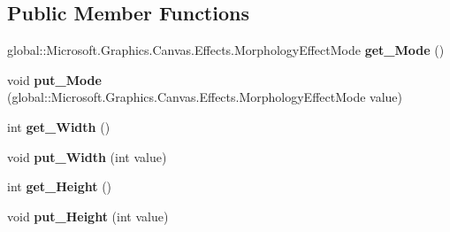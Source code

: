\subsection*{Public Member Functions}
\begin{DoxyCompactItemize}
\item 
\mbox{\label{interface_microsoft_1_1_graphics_1_1_canvas_1_1_effects_1_1_i_morphology_effect_a4625903e2e2033038f140f494007ccef}} 
global\+::\+Microsoft.\+Graphics.\+Canvas.\+Effects.\+Morphology\+Effect\+Mode {\bfseries get\+\_\+\+Mode} ()
\item 
\mbox{\label{interface_microsoft_1_1_graphics_1_1_canvas_1_1_effects_1_1_i_morphology_effect_ae67e959972393bca5d6e02aa06cd227b}} 
void {\bfseries put\+\_\+\+Mode} (global\+::\+Microsoft.\+Graphics.\+Canvas.\+Effects.\+Morphology\+Effect\+Mode value)
\item 
\mbox{\label{interface_microsoft_1_1_graphics_1_1_canvas_1_1_effects_1_1_i_morphology_effect_a30eb746728372b5fdd4c6e783b9a3545}} 
int {\bfseries get\+\_\+\+Width} ()
\item 
\mbox{\label{interface_microsoft_1_1_graphics_1_1_canvas_1_1_effects_1_1_i_morphology_effect_ac8928007cf4daceb6edf45df25104160}} 
void {\bfseries put\+\_\+\+Width} (int value)
\item 
\mbox{\label{interface_microsoft_1_1_graphics_1_1_canvas_1_1_effects_1_1_i_morphology_effect_a894c0a79c2bf5a0314930c5c502a7662}} 
int {\bfseries get\+\_\+\+Height} ()
\item 
\mbox{\label{interface_microsoft_1_1_graphics_1_1_canvas_1_1_effects_1_1_i_morphology_effect_aefc8baeb4576bca214b2862f5b188ff8}} 
void {\bfseries put\+\_\+\+Height} (int value)
\item 
\mbox{\label{interface_microsoft_1_1_graphics_1_1_canvas_1_1_effects_1_1_i_morphology_effect_ac0ce4230c50de3053b0200c3868607d6}} 

\end{DoxyCompactItemize}
